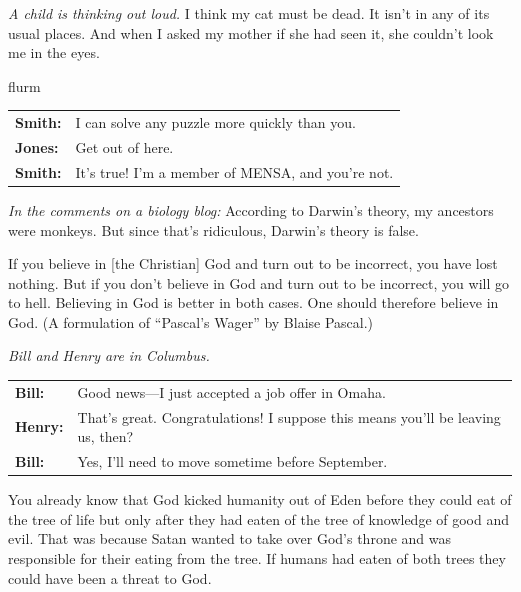 \begin{exercises}
\item \textit{A child is thinking out loud. }I think my cat must be dead. It isn't in any of its usual places. And when I asked my mother if she had seen it, she couldn't look me in the eyes. 

\item {\color{white}flurm}
\vspace{-24pt}
\begin{adjustwidth}{2em}{0em}
\begin{longtabu}{p{.1\linewidth}p{.8\linewidth}}
\textbf{Smith:} & I can solve any puzzle more quickly than you.\\
\textbf{Jones:}& Get out of here. \\
\textbf{Smith:} & It's true! I'm a member of MENSA, and you're not. 
\end{longtabu}
\end{adjustwidth}
\vspace{-.9cm}

\item \textit{In the comments on a biology blog: }According to Darwin's theory, my ancestors were monkeys. But since that's ridiculous, Darwin's theory is false. 

\item If you believe in [the Christian] God and turn out to be incorrect, you have lost nothing. But if you don't believe in God and turn out to be incorrect, you will go to hell. Believing in God is better in both cases. One should therefore believe in God. (A formulation of ``Pascal's Wager'' by Blaise Pascal.) 

\item \textit{Bill and Henry are in Columbus.}
\vspace{-8pt}
\begin{adjustwidth}{2em}{0em}
\begin{longtabu}{p{.1\linewidth}p{.8\linewidth}}
\textbf{Bill:} & Good news---I just accepted a job offer in Omaha. \\
\textbf{Henry:} & That's great. Congratulations! I suppose this means you'll be leaving us, then?\\
\textbf{Bill:} & Yes, I'll need to move sometime before September.  \\
\end{longtabu}
\end{adjustwidth}
\vspace{-.9cm}

\item You already know that God kicked humanity out of Eden before they could eat of the tree of life but only after they had eaten of the tree of knowledge of good and evil. That was because Satan wanted to take over God's throne and was responsible for their eating from the tree. If humans had eaten of both trees they could have been a threat to God. 

\end{exercises}

